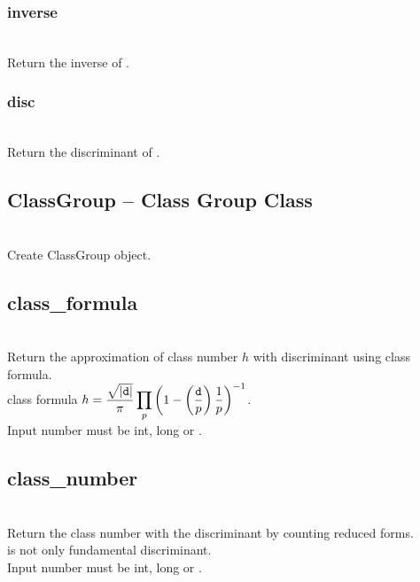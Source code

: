   \subsubsection{inverse}
  \\
  \spacing
  \quad Return the inverse of . \\
%
  \subsubsection{disc}
  \\
  \spacing
  \quad Return the discriminant of . \\
%
  \subsection{ClassGroup -- Class Group Class}
  \initialize
  \\
  \spacing
  \quad Create ClassGroup object.
  \method
   
  \subsection{class\_formula}
   \\
   \spacing
   \quad Return the approximation of class number $h$ with discriminant  using class formula. \\
   \spacing
   \quad class formula $\displaystyle h = \frac{\sqrt{|{\texttt d}|}}{\pi}\prod_{p}\left(1 - \left(\frac{{\texttt d}}{p}\right) \frac{1}{p}\right)^{-1}$. \\
   \spacing
   \quad Input number  must be int, long or .  
%
  \subsection{class\_number}
   \\
   \spacing
   \quad Return the class number with the discriminant  by counting reduced forms. \\
   \spacing
   \quad {} is not only fundamental discriminant. \\
   \spacing
   \quad Input number  must be int, long or . 
%
